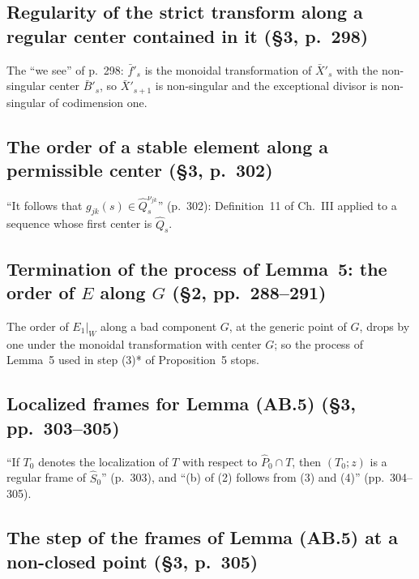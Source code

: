
\subsection*{Regularity of the strict transform along a regular center contained in it (\S3, p.~298)}

The ``we see'' of p.~298: $\bar f'_s$ is the monoidal transformation of $\bar X'_s$ with the non-singular center
$\bar B'_s$, so $\bar X'_{s+1}$ is non-singular and the exceptional divisor is non-singular of codimension one.


\subsection*{The order of a stable element along a permissible center (\S3, p.~302)}

``It follows that $g_{jk}(s)\in\hat Q_s^{\nu_{jk}}$'' (p.~302): Definition~11 of Ch.~III applied to a sequence whose first
center is $\hat Q_s$.


\subsection*{Termination of the process of Lemma~5: the order of $E$ along $G$ (\S2, pp.~288--291)}

The order of $E_1|_W$ along a bad component $G$, at the generic point of $G$, drops by one under the monoidal
transformation with center $G$; so the process of Lemma~5 used in step (3)* of Proposition~5 stops.


\subsection*{Localized frames for Lemma (AB.5) (\S3, pp.~303--305)}

``If $T_0$ denotes the localization of $T$ with respect to $\hat P_0\cap T$, then $(T_0;z)$ is a regular frame of
$\hat S_0$'' (p.~303), and ``(b) of (2) follows from (3) and (4)'' (pp.~304--305).


\subsection*{The step of the frames of Lemma (AB.5) at a non-closed point (\S3, p.~305)}

